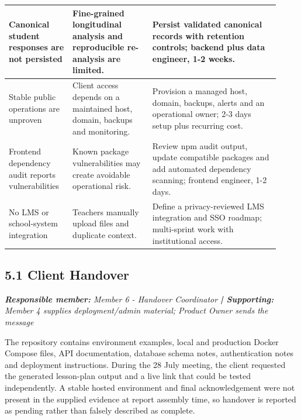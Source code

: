 \documentclass[11pt,a4paper]{article}
\begin{document}
\begin{small}
\begin{longtable}{>{\raggedright\arraybackslash}p{0.216\linewidth}>{\raggedright\arraybackslash}p{0.270\linewidth}>{\raggedright\arraybackslash}p{0.433\linewidth}}
Canonical student responses are not persisted & Fine-grained longitudinal analysis and reproducible re-analysis are limited. & Persist validated canonical records with retention controls; backend plus data engineer, 1-2 weeks. \\ \hline

Stable public operations are unproven & Client access depends on a maintained host, domain, backups and monitoring. & Provision a managed host, domain, backups, alerts and an operational owner; 2-3 days setup plus recurring cost. \\ \hline

Frontend dependency audit reports vulnerabilities & Known package vulnerabilities may create avoidable operational risk. & Review npm audit output, update compatible packages and add automated dependency scanning; frontend engineer, 1-2 days. \\ \hline

No LMS or school-system integration & Teachers manually upload files and duplicate context. & Define a privacy-reviewed LMS integration and SSO roadmap; multi-sprint work with institutional access. \\ \hline

\end{longtable}

\end{small}

\subsection*{5.1 Client Handover}


\noindent\textit{\textbf{Responsible member: }Member 6 - Handover Coordinator\textbf{ | Supporting: }Member 4 supplies deployment/admin material; Product Owner sends the message}\par

The repository contains environment examples, local and production Docker Compose files, API documentation, database schema notes, authentication notes and deployment instructions. During the 28 July meeting, the client requested the generated lesson-plan output and a live link that could be tested independently. A stable hosted environment and final acknowledgement were not present in the supplied evidence at report assembly time, so handover is reported as pending rather than falsely described as complete.\par
\end{document}

